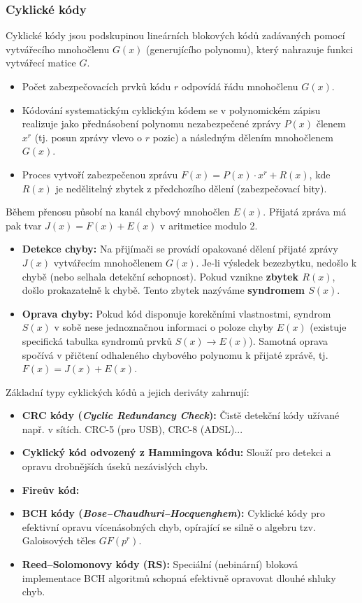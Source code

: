     \subsubsection{Cyklické kódy}
        Cyklické kódy jsou podskupinou lineárních blokových kódů zadávaných pomocí vytvářecího mnohočlenu $G(x)$ (generujícího polynomu), který nahrazuje funkci vytvářecí matice $G$.
        \begin{itemize}
            \item Počet zabezpečovacích prvků kódu $r$ odpovídá řádu mnohočlenu $G(x)$.
            \item Kódování systematickým cyklickým kódem se v polynomickém zápisu realizuje jako přednásobení polynomu nezabezpečené zprávy $P(x)$ členem $x^r$ (tj. posun zprávy vlevo o $r$ pozic) a následným dělením mnohočlenem $G(x)$.
            \item Proces vytvoří zabezpečenou zprávu $F(x) = P(x) \cdot x^r + R(x)$, kde $R(x)$ je nedělitelný zbytek z předchozího dělení (zabezpečovací bity).
        \end{itemize}
        Během přenosu působí na kanál chybový mnohočlen $E(x)$. Přijatá zpráva má pak tvar $J(x) = F(x) + E(x)$ v aritmetice modulo 2.
        \begin{itemize}
            \item \textbf{Detekce chyby:} Na přijímači se provádí opakované dělení přijaté zprávy $J(x)$ vytvářecím mnohočlenem $G(x)$. Je-li výsledek bezezbytku, nedošlo k chybě (nebo selhala detekční schopnost). Pokud vznikne \textbf{zbytek $R(x)$}, došlo prokazatelně k chybě. Tento zbytek nazýváme \textbf{syndromem $S(x)$}.
            \item \textbf{Oprava chyby:} Pokud kód disponuje korekčními vlastnostmi, syndrom $S(x)$ v sobě nese jednoznačnou informaci o poloze chyby $E(x)$ (existuje specifická tabulka syndromů prvků $S(x) \rightarrow E(x)$). Samotná oprava spočívá v přičtení odhaleného chybového polynomu k přijaté zprávě, tj. $F(x) = J(x) + E(x)$.
        \end{itemize}
        Základní typy cyklických kódů a jejich deriváty zahrnují:
        \begin{itemize}
            \item \textbf{CRC kódy (\textit{Cyclic Redundancy Check}):} Čistě detekční kódy užívané např. v sítích. CRC-5 (pro USB), CRC-8 (ADSL)...
            \item \textbf{Cyklický kód odvozený z Hammingova kódu:} Slouží pro detekci a opravu drobnějších úseků nezávislých chyb.
            \item \textbf{Fireův kód:}
            \item \textbf{BCH kódy (\textit{Bose--Chaudhuri--Hocquenghem}):} Cyklické kódy pro efektivní opravu vícenásobných chyb, opírající se silně o algebru tzv. Galoisových těles $GF(p^r)$.
            \item \textbf{Reed--Solomonovy kódy (RS):} Speciální (nebinární) bloková implementace BCH algoritmů schopná efektivně opravovat dlouhé shluky chyb.
        \end{itemize}
